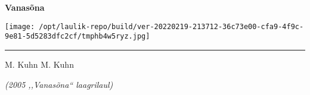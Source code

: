 \documentclass[10pt]{book}
\begin{document}
\vspace{-0.05in}
\pagebreak[3]
\clearpage
{
  \samepage
  \raggedbottom
  \raggedright
  \sloppy


  \vspace{0.2in}
    \noindent\begin{minipage}{.1\textwidth}
      \hfill\vspace{0.1in}
    \end{minipage}%
    \noindent\begin{minipage}{.8\textwidth}
      \centering
      \bfseries
      \large Vanasõna
    \end{minipage}%
    \noindent\begin{minipage}{.1\textwidth}
      \texttt{[image: /opt/laulik-repo/build/ver-20220219-213712-36c73e00-cfa9-4f9c-9e81-5d5283dfc2cf/tmphb4w5ryz.jpg]}
    \end{minipage}
  \nopagebreak[4]
  \vspace{0.1in}
  \nopagebreak[4]
  \hrule height 0.05ex
  \nopagebreak[4]
  \vspace{-0.05in}

  {\footnotesize M. Kuhn \hfill M. Kuhn }\\
  \vspace{0.01in}

  {\em {\footnotesize (2005 ,,Vanas\~ona{``} laagrilaul) } }
  \vspace{0.01in}

  \vspace{-0.05in}
  \nopagebreak[4]
  {%
\parindent 0pt
\noindent
\ifx\preLilyPondExample \undefined
\else
  \expandafter\preLilyPondExample
\fi
\def\lilypondbook{}%

\ifx\postLilyPondExample \undefined
\else
  \expandafter\postLilyPondExample
\fi
}
  \vspace{-0.15in}

}
\end{document}
